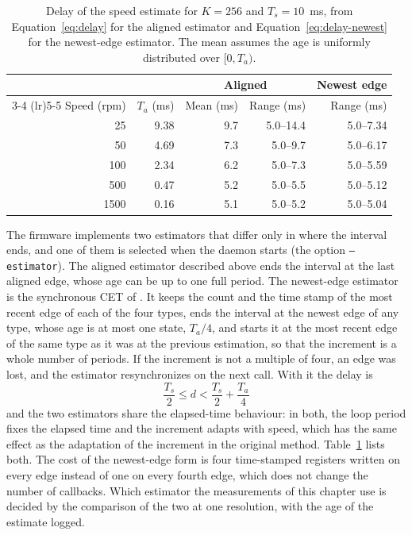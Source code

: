 \begin{table}[htbp]
    \centering
    \caption[Delay of the speed estimate]{Delay of the speed estimate for $K = 256$ and $T_s = 10$~ms, from Equation~\ref{eq:delay} for the aligned estimator and Equation~\ref{eq:delay-newest} for the newest-edge estimator. The mean assumes the age is uniformly distributed over $[0, T_a)$.}
    \label{tab:delay}
    \begin{tabular}{@{}rrrrr@{}}
        \toprule
        & & \multicolumn{2}{c}{Aligned} & Newest edge \\
        \cmidrule(lr){3-4} \cmidrule(lr){5-5}
        Speed (rpm) & $T_a$ (ms) & Mean (ms) & Range (ms) & Range (ms) \\
        \midrule
        25 & 9.38 & 9.7 & 5.0--14.4 & 5.0--7.34 \\
        50 & 4.69 & 7.3 & 5.0--9.7 & 5.0--6.17 \\
        100 & 2.34 & 6.2 & 5.0--7.3 & 5.0--5.59 \\
        500 & 0.47 & 5.2 & 5.0--5.5 & 5.0--5.12 \\
        1500 & 0.16 & 5.1 & 5.0--5.2 & 5.0--5.04 \\
        \bottomrule
    \end{tabular}
\end{table}

The firmware implements two estimators that differ only in where the interval ends, and one of them is selected when the daemon starts (the option \texttt{--estimator}). The aligned estimator described above ends the interval at the last aligned edge, whose age can be up to one full period. The newest-edge estimator is the synchronous CET of \citet{anuchin2019}. It keeps the count and the time stamp of the most recent edge of each of the four types, ends the interval at the newest edge of any type, whose age is at most one state, $T_a/4$, and starts it at the most recent edge of the same type as it was at the previous estimation, so that the increment is a whole number of periods. If the increment is not a multiple of four, an edge was lost, and the estimator resynchronizes on the next call. With it the delay is
\begin{equation}
    \frac{T_s}{2} \leq d < \frac{T_s}{2} + \frac{T_a}{4}
    \label{eq:delay-newest}
\end{equation}
and the two estimators share the elapsed-time behaviour: in both, the loop period fixes the elapsed time and the increment adapts with speed, which has the same effect as the adaptation of the increment in the original method. Table~\ref{tab:delay} lists both. The cost of the newest-edge form is four time-stamped registers written on every edge instead of one on every fourth edge, which does not change the number of callbacks. Which estimator the measurements of this chapter use is decided by the comparison of the two at one resolution, with the age of the estimate logged.

